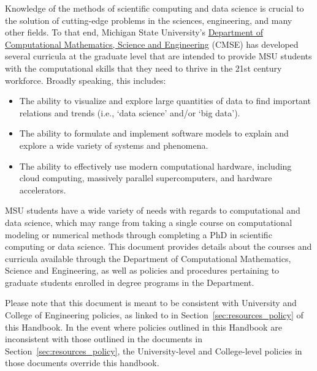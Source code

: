 \vspace{2mm}
Knowledge of the methods of scientific computing and data science is
crucial to the solution of cutting-edge problems in the sciences,
engineering, and many other fields.  To that end, Michigan State
University's \href{http://cmse.msu.edu}{Department of Computational
Mathematics, Science and Engineering} (CMSE) has developed several
curricula at the graduate level that are intended to provide MSU
students with the computational skills that they need to thrive in the
21st century workforce.  Broadly speaking, this includes:

\begin{itemize}
\item The ability to visualize and explore large quantities of data to
  find important relations and trends (i.e., `data science' and/or
  `big data').

\item The ability to formulate and implement  software models to
  explain and explore a wide variety of systems and phenomena.

\item The ability to effectively use modern computational hardware,
  including cloud computing, massively parallel supercomputers, and
  hardware accelerators.

\end{itemize}

MSU students have a wide variety of needs with regards to
computational and data science, which may range from taking a single
course on computational modeling or numerical methods through
completing a PhD in scientific computing or data science.  This
document provides details about the courses and curricula available
through the Department of Computational Mathematics, Science and
Engineering, as well as policies and procedures pertaining to graduate
students enrolled in degree programs in the Department.

Please note that this document is meant to be consistent with
University and College of Engineering policies, as linked to in
Section~\ref{sec:resources_policy} of this Handbook.  In the event
where policies outlined in this Handbook are inconsistent with those
outlined in the documents in Section~\ref{sec:resources_policy}, the
University-level and College-level policies in those documents
override this handbook.
